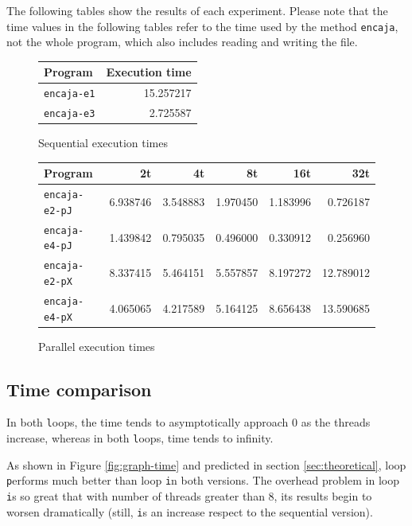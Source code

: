 \documentclass[a4paper]{article}
\newcommand{\m}[1]{\texttt{#1}}
\newcommand{\x}[1]{\m{#1}}
\renewcommand{\j}[1]{\m{#1}}
\begin{document}
The following tables show the results of each experiment. Please note that the time values in the following tables refer to the time used by the method \m{encaja}, not the whole program, which also includes reading and writing the file.

\begin{figure}[h]
	\centering
	\begin{tabular}{l r}
		Program            & Execution time \\ \hline
		\m{encaja-e1} 	   & 15.257217      \\
		\m{encaja-e3}      &  2.725587      \\ \hline
	\end{tabular}
	\caption{Sequential execution times}
	\label{fig:table-time-seq}
\end{figure}
\begin{figure}[h]
	\centering
	\begin{tabular}{l r r r r r}
		Program               & 2t        & 4t        & 8t        & 16t        & 32t        \\ \hline
		\m{encaja-e2-pJ} 	  & 6.938746  & 3.548883  & 1.970450  & 1.183996   &  0.726187  \\
		\m{encaja-e4-pJ} 	  & 1.439842  & 0.795035  & 0.496000  & 0.330912   &  0.256960  \\
		\m{encaja-e2-pX} 	  & 8.337415  & 5.464151  & 5.557857  & 8.197272   & 12.789012  \\
		\m{encaja-e4-pX}	  & 4.065065  & 4.217589  & 5.164125  & 8.656438   & 13.590685  \\ \hline
	\end{tabular}
	\caption{Parallel execution times}
	\label{fig:table-time}
\end{figure}
\newpage
{}

\subsection{Time comparison}
In both \j loops, the time tends to asymptotically approach 0 as the threads increase, whereas in both \x loops, time tends to infinity.

As shown in Figure \ref{fig:graph-time} and predicted in section \ref{sec:theoretical}, loop \j performs much better than loop \x in both versions. The overhead problem in loop \x is so great that with number of threads greater than 8, its results begin to worsen dramatically (still, \x is an increase respect to the sequential version).
\end{document}
